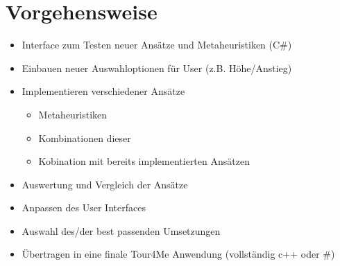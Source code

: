 \documentclass[aspectratio=169,xcolor=dvipsnames, t]{beamer}
\begin{document}
	
	\section{Vorgehensweise}		
	\begin{frame}	
		\vspace{0.5cm}
		\begin{block}{}
			\begin{itemize}[<+->]
				\item Interface zum Testen neuer Ansätze und Metaheuristiken (C\#)
				\item Einbauen neuer Auswahloptionen für User (z.B. Höhe/Anstieg)
				\item Implementieren verschiedener Ansätze
				\begin{itemize}[<+->]
					\item Metaheuristiken
					\item Kombinationen dieser
					\item Kobination mit bereits implementierten Ansätzen
				\end{itemize}
				\item Auswertung und Vergleich der Ansätze
				\item Anpassen des User Interfaces
				\item Auswahl des/der best passenden Umsetzungen
				\item Übertragen in eine finale Tour4Me Anwendung (vollständig c++ oder \#)
			\end{itemize}
		\end{block}
	\end{frame}
	
\end{document}
